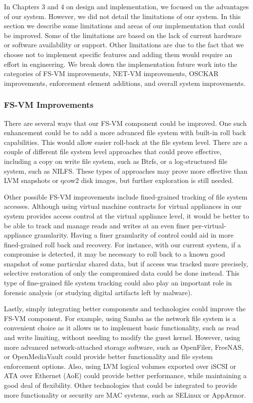 In Chapters 3 and 4 on design and implementation, we focused on the advantages of our system. However, we did not detail the limitations of our system. In this section we describe some limitations and areas of our implementation that could be improved. Some of the limitations are based on the lack of current hardware or software availability or support. Other limitations are due to the fact that we choose not to implement specific features and adding them would require an effort in engineering. We break down the implementation future work into the categories of FS-VM improvements, NET-VM improvements, OSCKAR improvements, enforcement element additions, and overall system improvements.

\subsubsection{FS-VM Improvements}

There are several ways that our FS-VM component could be improved. One such enhancement could be to add a more advanced file system with built-in roll back capabilities. This would allow easier roll-back at the file system level. There are a couple of different file system level approaches that could prove effective, including a copy on write file system, such as Btrfs\cite{btrfs_website}, or a log-structured file system, such as NILFS\cite{nilfs_website}. These types of approaches may prove more effective than LVM snapshots or qcow2 disk images, but further exploration is still needed.

Other possible FS-VM improvements include fined-grained tracking of file system accesses. Although using virtual machine contracts for virtual appliances in our system provides access control at the virtual appliance level, it would be better to be able to track and manage reads and writes at an even finer per-virtual-appliance granularity. Having a finer granularity of control could aid in more fined-grained roll back and recovery. For instance, with our current system, if a compromise is detected, it may be necessary to roll back to a known good snapshot of some particular shared data, but if access was tracked more precisely, selective restoration of only the compromised data could be done instead. This type of fine-grained file system tracking could also play an important role in forensic analysis (or studying digital artifacts left by malware).

Lastly, simply integrating better components and technologies could improve the FS-VM component. For example, using Samba as the network file system is a convenient choice as it allows us to implement basic functionality, such as read and write limiting, without needing to modify the guest kernel. However, using more advanced network-attached storage software, such as OpenFiler\cite{openfiler_website}, FreeNAS\cite{freenas_website}, or OpenMediaVault\cite{openmediavault_website} could provide better functionality and file system enforcement options. Also, using LVM logical volumes exported over iSCSI or ATA over Ethernet (AoE) could provide better performance, while maintaining a good deal of flexibility. Other technologies that could be integrated to provide more functionality or security are MAC systems, such as SELinux or AppArmor.

